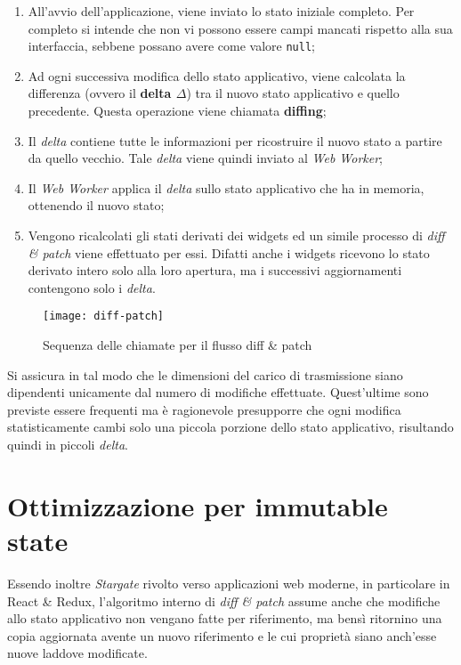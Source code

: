 \begin{enumerate}
  \item All'avvio dell'applicazione, viene inviato lo stato iniziale completo. Per completo si intende che non vi possono essere campi mancati rispetto alla sua interfaccia, sebbene possano avere come valore \texttt{null};
  \item Ad ogni successiva modifica dello stato applicativo, viene calcolata la differenza (ovvero il \textbf{delta $\Delta$}) tra il nuovo stato applicativo e quello precedente. Questa operazione viene chiamata \textbf{diffing};
  \item Il \textit{delta} contiene tutte le informazioni per ricostruire il nuovo stato a partire da quello vecchio. Tale \textit{delta} viene quindi inviato al \textit{Web Worker};
  \item Il \textit{Web Worker} applica il \textit{delta} sullo stato applicativo che ha in memoria, ottenendo il nuovo stato;
  \item Vengono ricalcolati gli stati derivati dei widgets ed un simile processo di \textit{diff \& patch} viene effettuato per essi. Difatti anche i widgets ricevono lo stato derivato intero solo alla loro apertura, ma i successivi aggiornamenti contengono solo i \textit{delta}.
\end{enumerate}

\begin{figure}[H] 
  \centering 
  \texttt{[image: diff-patch]} 
  \caption{Sequenza delle chiamate per il flusso diff \& patch}
\end{figure}

Si assicura in tal modo che le dimensioni del carico di trasmissione siano dipendenti unicamente dal numero di modifiche effettuate. Quest'ultime sono previste essere frequenti ma è ragionevole presupporre che ogni modifica statisticamente cambi solo una piccola porzione dello stato applicativo, risultando quindi in piccoli \textit{delta}. \\

\section{Ottimizzazione per immutable state}

Essendo inoltre \textit{Stargate} rivolto verso applicazioni web moderne, in particolare in React \& Redux, l'algoritmo interno di \textit{diff \& patch} assume anche che modifiche allo stato applicativo non vengano fatte per riferimento, ma bensì ritornino una copia aggiornata avente un nuovo riferimento e le cui proprietà siano anch'esse nuove laddove modificate. \\

